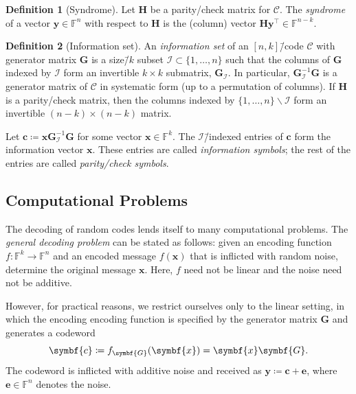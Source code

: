 \documentclass[version=last, paper=A4, parskip=half, oneside]{scrbook}
\theoremstyle{plain}
\theoremstyle{definition}
\newtheorem{definition}{Definition}
\theoremstyle{remark}
\renewcommand*{\vec}{\symbf}
\newcommand*{\mat}{\symbf}
\newcommand*{\trans}{\top}%
\newcommand*{\FF}{\ensuremath{\mathbb{F}}}
\begin{document}
\begin{definition}[Syndrome]
  Let \(\mat{H}\) be a parity\-/check matrix for \(\mathcal{C}\).  The
  \emph{syndrome} of a vector \(\vec{y} \in \FF^n\) with respect to \(\mat{H}\)
  is the (column) vector \(\mat{H} \vec{y}^{\trans} \in \FF^{n - k}\).
\end{definition}

\begin{definition}[Information set]\label{def:information-set}
  An \emph{information set} of an \([n, k]\)\=/code \(\mathcal{C}\) with
  generator matrix \(\mat{G}\) is a size\=/\(k\) subset
  \(\mathcal{I} \subset \{1, \ldots, n\}\) such that the columns of \(\mat{G}\)
  indexed by \(\mathcal{I}\) form an invertible \(k \times k\) submatrix,
  \(\mat{G}_{\mathcal{I}}\).  In particular,
  \(\mat{G}_{\mathcal{I}}^{-1} \mat{G}\) is a generator matrix of
  \(\mathcal{C}\) in systematic form (up to a permutation of columns).  If
  \(\mat{H}\) is a parity\-/check matrix, then the columns indexed by
  \(\{1, \ldots, n\} \smallsetminus \mathcal{I}\) form an invertible
  \((n - k) \times (n - k)\) matrix.
\end{definition}

Let \(\vec{c} \coloneqq \vec{x} \mat{G}_{\mathcal{I}}^{-1} \mat{G}\) for some
vector \(\vec{x} \in \FF^k\).  The \(\mathcal{I}\)\=/indexed entries of
\(\vec{c}\) form the information vector \(\vec{x}\).  These entries are called
\emph{information symbols}; the rest of the entries are called
\emph{parity\-/check symbols}.

\subsection{Computational Problems}\label{sec:LC-computational-problems}

The decoding of random codes lends itself to many computational problems.  The
\emph{general decoding problem} can be stated as follows: given an encoding
function \(f\colon \FF^k \to \FF^n\) and an encoded message \(f(\vec{x})\) that
is inflicted with random noise, determine the original message \(\vec{x}\).
Here, \(f\) need not be linear and the noise need not be additive.

However, for practical reasons, we restrict ourselves only to the linear
setting, in which the encoding encoding function is specified by the generator
matrix \(\mat{G}\) and generates a codeword
\[
  \vec{c} \coloneqq f_{\mat{G}}(\vec{x}) = \vec{x} \mat{G}\text.
\]
The codeword is inflicted with additive noise and received as
\(\vec{y} \coloneqq \vec{c} + \vec{e}\), where \(\vec{e} \in \FF^n\) denotes the
noise.
\end{document}
